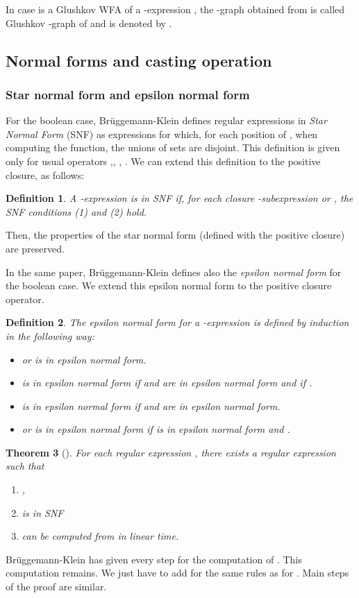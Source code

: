\documentclass[11pt]{article}
\newtheorem{theorem}{Theorem}
\newtheorem{definition}[theorem]{Definition}
\begin{document}
In case  is a Glushkov WFA of a -expression , the -graph obtained from  is called  Glushkov -graph of  and is denoted by .


\subsection{Normal forms and casting operation}
\subsubsection*{Star normal form and epsilon normal form}
For the boolean case, Br\"uggemann-Klein defines regular expressions in {\it Star Normal Form} (SNF) \cite{Bru93} as expressions  for which, for each
 position  of , when computing the  function, the unions of sets are disjoint. This definition is given only for usual 
operators ,, , . We can extend this definition to the positive closure,  as follows:
\begin{definition}
A -expression  is in SNF if, for each closure -subexpression  or , the SNF conditions 
(1)  and (2)  hold.
\end{definition} 
Then, the properties of the star normal form (defined with the positive closure) are preserved.

In the same paper, Br\"uggemann-Klein defines also the {\it epsilon normal form} for the boolean case. We extend this epsilon normal form to the 
positive closure operator.
\begin{definition}
The epsilon normal form for a -expression  is defined by induction in the following way:
\begin{itemize}
\item{ or }  is in epsilon normal form.
\item{}  is in epsilon normal form if  and  are in epsilon normal form and if 
.
\item{}  is in epsilon normal form if  and  are in epsilon normal form.
\item{ or }  is in epsilon normal form if  is in epsilon normal form and .
\end{itemize}
\end{definition}

\begin{theorem}[\cite{Bru93}]
 For each regular expression , there exists a regular expression  such that 
 \begin{enumerate}
 \item ,
\item  is in SNF
\item  can be computed from  in linear time.
\end{enumerate}
\end{theorem}
Br\"uggemann-Klein has given every step for the computation of . This computation remains. We just have to add 
for  the same rules as for . Main steps of the proof are similar.\\
\end{document}
